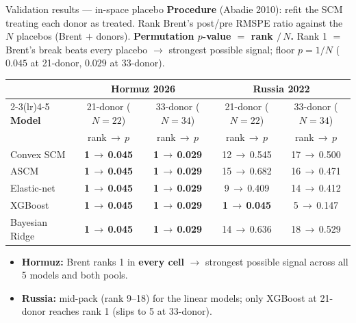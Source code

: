 \documentclass[aspectratio=169,11pt]{beamer}
\newcommand{\src}[1]{{\footnotesize\textcolor{muted}{(#1)}}}
\newcommand{\hd}[1]{\textbf{#1}}
\begin{document}
\begin{frame}[shrink=10]{Validation results --- in-space placebo}
  \footnotesize
  \hd{Procedure} \src{Abadie 2010}: refit the SCM treating each donor as treated. Rank Brent's post/pre RMSPE ratio against the $N$ placebos (Brent $+$ donors). \hd{Permutation $p$-value $= $ rank $/\, N$.} Rank 1 $=$ Brent's break beats every placebo $\rightarrow$ strongest possible signal; floor $p = 1/N$ ($0.045$ at 21-donor, $0.029$ at 33-donor).

  \vspace{0.3em}
  \begin{center}
  \scriptsize
  \begin{tabular}{@{}l c c c c@{}}
    \toprule
                   & \multicolumn{2}{c}{\hd{Hormuz 2026}} & \multicolumn{2}{c}{\hd{Russia 2022}} \\
    \cmidrule(lr){2-3}\cmidrule(lr){4-5}
    \hd{Model}     & 21-donor ($N{=}22$) & 33-donor ($N{=}34$) & 21-donor ($N{=}22$) & 33-donor ($N{=}34$) \\
                   & rank\,$\rightarrow$\,$p$ & rank\,$\rightarrow$\,$p$ & rank\,$\rightarrow$\,$p$ & rank\,$\rightarrow$\,$p$ \\
    \midrule
    Convex SCM     & \textbf{1\,$\rightarrow$\,0.045} & \textbf{1\,$\rightarrow$\,0.029} & 12\,$\rightarrow$\,0.545 & 17\,$\rightarrow$\,0.500 \\
    ASCM           & \textbf{1\,$\rightarrow$\,0.045} & \textbf{1\,$\rightarrow$\,0.029} & 15\,$\rightarrow$\,0.682 & 16\,$\rightarrow$\,0.471 \\
    Elastic-net    & \textbf{1\,$\rightarrow$\,0.045} & \textbf{1\,$\rightarrow$\,0.029} & 9\,$\rightarrow$\,0.409  & 14\,$\rightarrow$\,0.412 \\
    XGBoost        & \textbf{1\,$\rightarrow$\,0.045} & \textbf{1\,$\rightarrow$\,0.029} & \textbf{1\,$\rightarrow$\,0.045}  & 5\,$\rightarrow$\,0.147  \\
    Bayesian Ridge & \textbf{1\,$\rightarrow$\,0.045} & \textbf{1\,$\rightarrow$\,0.029} & 14\,$\rightarrow$\,0.636 & 18\,$\rightarrow$\,0.529 \\
    \bottomrule
  \end{tabular}
  \normalsize
  \end{center}

  \vspace{0.3em}
  \begin{itemize}\setlength\itemsep{0.05em}
    \item \hd{Hormuz:} Brent ranks 1 in \hd{every cell} $\rightarrow$ strongest possible signal across all 5 models and both pools.
    \item \hd{Russia:} mid-pack (rank 9--18) for the linear models; only XGBoost at 21-donor reaches rank 1 (slips to 5 at 33-donor). 
  \end{itemize}

\end{frame}
\end{document}
